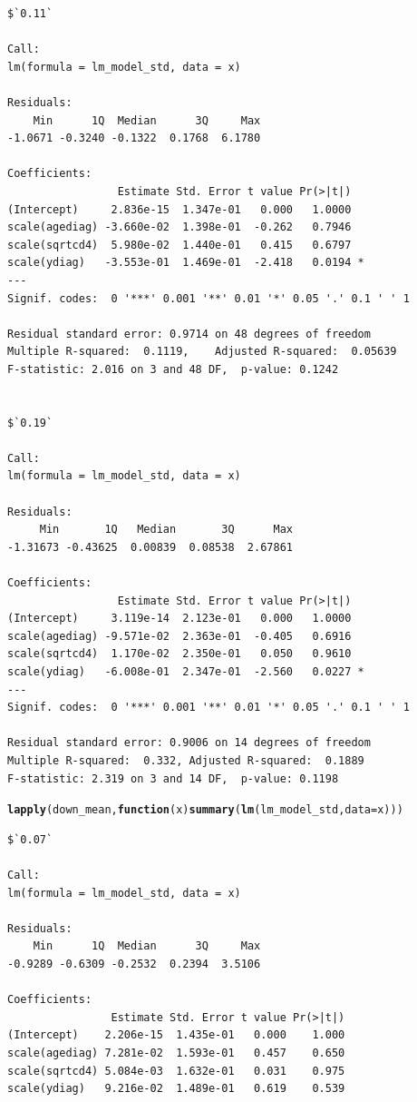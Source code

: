 \documentclass[]{revtex4}\usepackage[]{graphicx}\usepackage[]{color}
\makeatletter
\newcommand{\hlstd}[1]{\textcolor[rgb]{0.345,0.345,0.345}{#1}}%
\newcommand{\hlkwa}[1]{\textcolor[rgb]{0.161,0.373,0.58}{\textbf{#1}}}%
\newcommand{\hlkwc}[1]{\textcolor[rgb]{0.333,0.667,0.333}{#1}}%
\newcommand{\hlkwd}[1]{\textcolor[rgb]{0.737,0.353,0.396}{\textbf{#1}}}%
\newenvironment{kframe}{%
 \def\at@end@of@kframe{}%
 \ifinner\ifhmode%
  \def\at@end@of@kframe{\end{minipage}}%
  \begin{minipage}{\columnwidth}%
 \fi\fi%
 \def\FrameCommand##1{\hskip\@totalleftmargin \hskip-\fboxsep
 \colorbox{shadecolor}{##1}\hskip-\fboxsep
     \hskip-\linewidth \hskip-\@totalleftmargin \hskip\columnwidth}%
 \MakeFramed {\advance\hsize-\width
   \@totalleftmargin\z@ \linewidth\hsize
   \@setminipage}}%
 {\par\unskip\endMakeFramed%
 \at@end@of@kframe}
\newenvironment{knitrout}{}{} %
\makeatother
\begin{document}
\begin{knitrout}
\begin{kframe}
\begin{verbatim}
$`0.11`

Call:
lm(formula = lm_model_std, data = x)

Residuals:
    Min      1Q  Median      3Q     Max 
-1.0671 -0.3240 -0.1322  0.1768  6.1780 

Coefficients:
                 Estimate Std. Error t value Pr(>|t|)  
(Intercept)     2.836e-15  1.347e-01   0.000   1.0000  
scale(agediag) -3.660e-02  1.398e-01  -0.262   0.7946  
scale(sqrtcd4)  5.980e-02  1.440e-01   0.415   0.6797  
scale(ydiag)   -3.553e-01  1.469e-01  -2.418   0.0194 *
---
Signif. codes:  0 '***' 0.001 '**' 0.01 '*' 0.05 '.' 0.1 ' ' 1

Residual standard error: 0.9714 on 48 degrees of freedom
Multiple R-squared:  0.1119,	Adjusted R-squared:  0.05639 
F-statistic: 2.016 on 3 and 48 DF,  p-value: 0.1242


$`0.19`

Call:
lm(formula = lm_model_std, data = x)

Residuals:
     Min       1Q   Median       3Q      Max 
-1.31673 -0.43625  0.00839  0.08538  2.67861 

Coefficients:
                 Estimate Std. Error t value Pr(>|t|)  
(Intercept)     3.119e-14  2.123e-01   0.000   1.0000  
scale(agediag) -9.571e-02  2.363e-01  -0.405   0.6916  
scale(sqrtcd4)  1.170e-02  2.350e-01   0.050   0.9610  
scale(ydiag)   -6.008e-01  2.347e-01  -2.560   0.0227 *
---
Signif. codes:  0 '***' 0.001 '**' 0.01 '*' 0.05 '.' 0.1 ' ' 1

Residual standard error: 0.9006 on 14 degrees of freedom
Multiple R-squared:  0.332,	Adjusted R-squared:  0.1889 
F-statistic: 2.319 on 3 and 14 DF,  p-value: 0.1198
\end{verbatim}
\begin{alltt}
\hlkwd{lapply}\hlstd{(down_mean,} \hlkwa{function}\hlstd{(}\hlkwc{x}\hlstd{)} \hlkwd{summary}\hlstd{(}\hlkwd{lm}\hlstd{(lm_model_std,} \hlkwc{data} \hlstd{= x)))}
\end{alltt}
\begin{verbatim}
$`0.07`

Call:
lm(formula = lm_model_std, data = x)

Residuals:
    Min      1Q  Median      3Q     Max 
-0.9289 -0.6309 -0.2532  0.2394  3.5106 

Coefficients:
                Estimate Std. Error t value Pr(>|t|)
(Intercept)    2.206e-15  1.435e-01   0.000    1.000
scale(agediag) 7.281e-02  1.593e-01   0.457    0.650
scale(sqrtcd4) 5.084e-03  1.632e-01   0.031    0.975
scale(ydiag)   9.216e-02  1.489e-01   0.619    0.539


\end{verbatim}
\end{kframe}
\end{knitrout}
\end{document}
